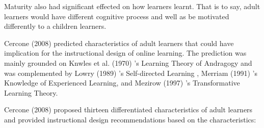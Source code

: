 Maturity also had significant effected on how learners learnt. That is to say, adult learners would have different cognitive process and well as be motivated differently to a children learners. 

Cercone (2008) \cite{cercone2008characteristics} predicted characteristics of adult learners that could have implication for the instructional design of online learning. The prediction was mainly grounded on Knwles et al. (1970) \cite{knowles1970modern}'s Learning Theory of Andragogy and was complemented by Lowry (1989) \cite{lowry1989supporting}'s Self-directed Learning , Merriam (1991) \cite{merriamcaffarella}'s Knowledge of Experienced Learning, and Mezirow (1997) \cite{mezirow1997transformative}'s Transformative Learning Theory.  

Cercone (2008) \cite{cercone2008characteristics} proposed thirteen differentiated characteristics of adult learners and provided instructional design recommendations based on the characteristics: 
